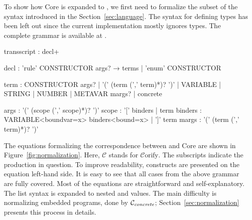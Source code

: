 To show how \Tosca Core is expanded to \Tosca, we first
need to formalize the subset of the \Tosca syntax introduced in
the Section~\ref{sec:language}. The syntax for defining types has been
left out since the current implementation mostly ignores types. The complete
grammar is available at
%
        {}{}.
%
\begin{lstANTLR}
transscript     : decl+										 

decl            : 'rule' CONSTRUCTOR args? → terms
                | 'enum' CONSTRUCTOR    
		
term           : CONSTRUCTOR args?							
                | '(' (term (',' term)*)? ')'
                | VARIABLE
                | STRING 
                | NUMBER  								                                      
                | METAVAR margs?                          
                | concrete												

args            : '(' (scope (',' scope)*)? ')' 
scope           : '[' binders       						
                | term										
binders         : VARIABLE<boundvar=x> binders<bound=x>    
                | ']' term									               
margs           : '(' (term (',' term)*)? ')'
\end{lstANTLR}
%
The equations formalizing the correspondence between \Tosca and
\Tosca Core are shown in Figure~\ref{fig:normalization}. Here,
$\mathcal{C}$ stands for $\mathcal{C}\text{orify}$. The subscripts
indicate the \antlr production in question. To improve readability,
\Tosca constructs are presented on the equation left-hand
side. It is easy to see that all cases from the above grammar are
fully covered. Most of the equations are straightforward and self-explanatory. 
The list syntax is expanded to nested  and  values.
The main difficulty is normalizing embedded programs, done by $\mathcal{C}_{\mathit{concrete}}$;  
Section~\ref{sec:normalization} presents this process in details.

